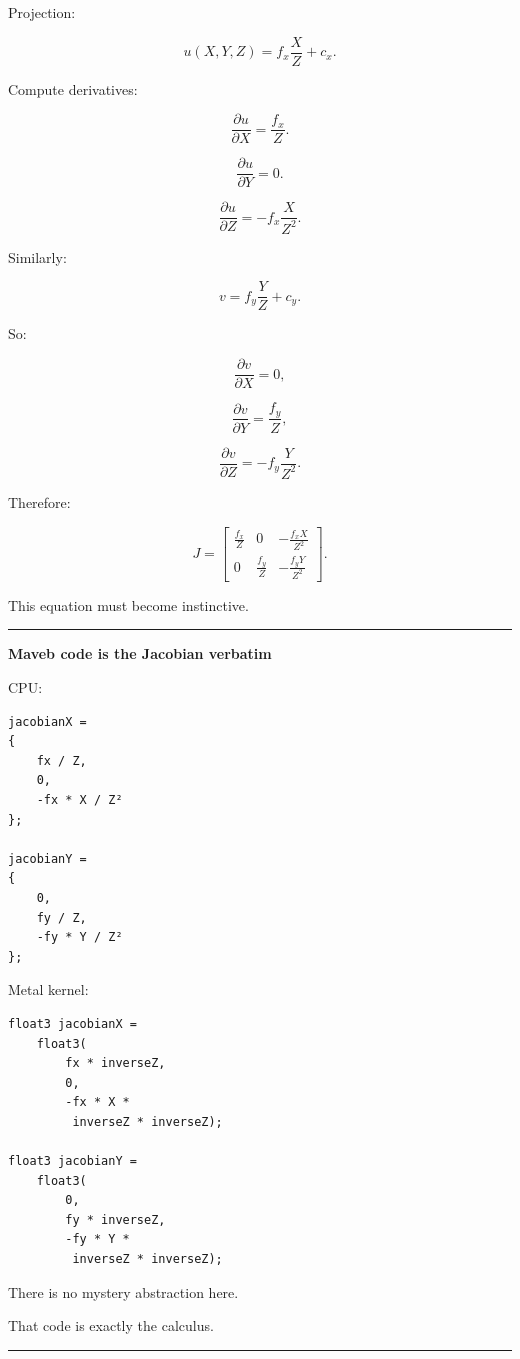 Projection:

\[
u(X,Y,Z)
=
f_x\frac XZ+c_x.
\]

Compute derivatives:

\[
\frac{\partial u}{\partial X}
=
\frac{f_x}{Z}.
\]

\[
\frac{\partial u}{\partial Y}
=
0.
\]

\[
\frac{\partial u}{\partial Z}
=
-f_x\frac{X}{Z^2}.
\]

Similarly:

\[
v=
f_y\frac YZ+c_y.
\]

So:

\[
\frac{\partial v}{\partial X}=0,
\]

\[
\frac{\partial v}{\partial Y}
=
\frac{f_y}{Z},
\]

\[
\frac{\partial v}{\partial Z}
=
-f_y\frac{Y}{Z^2}.
\]

Therefore:

\[
\boxed{
J=
\begin{bmatrix}
\frac{f_x}{Z}
&
0
&
-\frac{f_xX}{Z^2}
\\
0
&
\frac{f_y}{Z}
&
-\frac{f_yY}{Z^2}
\end{bmatrix}.
}
\]

This equation must become instinctive.

\begin{center}\rule{0.5\linewidth}{0.5pt}\end{center}

\textbf{Maveb code is the Jacobian verbatim}

CPU:

\begin{verbatim}
jacobianX =
{
    fx / Z,
    0,
    -fx * X / Z²
};

jacobianY =
{
    0,
    fy / Z,
    -fy * Y / Z²
};
\end{verbatim}

Metal kernel:

\begin{verbatim}
float3 jacobianX =
    float3(
        fx * inverseZ,
        0,
        -fx * X *
         inverseZ * inverseZ);

float3 jacobianY =
    float3(
        0,
        fy * inverseZ,
        -fy * Y *
         inverseZ * inverseZ);
\end{verbatim}

There is no mystery abstraction here.

That code is exactly the calculus.

\begin{center}\rule{0.5\linewidth}{0.5pt}\end{center}

